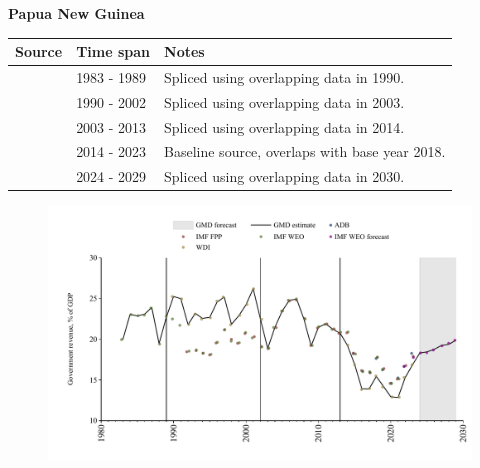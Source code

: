 \documentclass[12pt,a4paper,landscape]{article}
\begin{document}
\begin{adjustbox}{max totalsize={\paperwidth}{\paperheight},center}
\begin{minipage}[t][\textheight][t]{\textwidth}
\vspace*{0.5cm}
{}
\begin{center}
{\Large\bfseries Papua New Guinea}
\end{center}
\vspace{0.5cm}
\begin{table}[H]
\centering
\small
\begin{tabular}{|l|l|l|}
\hline
\textbf{Source} & \textbf{Time span} & \textbf{Notes} \\
\hline
\rowcolor{white}\cite{IMF_WEO}& 1983 - 1989 &Spliced using overlapping data in 1990.\\
\rowcolor{lightgray}\cite{WDI}& 1990 - 2002 &Spliced using overlapping data in 2003.\\
\rowcolor{white}\cite{IMF_WEO}& 2003 - 2013 &Spliced using overlapping data in 2014.\\
\rowcolor{lightgray}\cite{WDI}& 2014 - 2023 &Baseline source, overlaps with base year 2018.\\
\rowcolor{white}\cite{IMF_WEO_forecast}& 2024 - 2029 &Spliced using overlapping data in 2030.\\
\hline
\end{tabular}
\end{table}
\begin{figure}[H]
\centering
\includegraphics[width=\textwidth,height=0.6\textheight,keepaspectratio]{graphs/PNG_govrev_GDP.pdf}
\end{figure}
\end{minipage}
\end{adjustbox}
\end{document}
